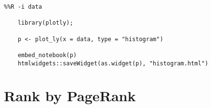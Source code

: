 \documentclass[12pt, a4paper]{article}
\begin{document}
\begin{minipage}{\linewidth} %
\vspace{2em}
\begin{verbatim}
%%R -i data

    library(plotly);

    p <- plot_ly(x = data, type = "histogram")

    embed_notebook(p)
    htmlwidgets::saveWidget(as.widget(p), "histogram.html")
\end{verbatim}
\vspace{2em}
\end{minipage}


\section{Rank by PageRank}
\end{document}
